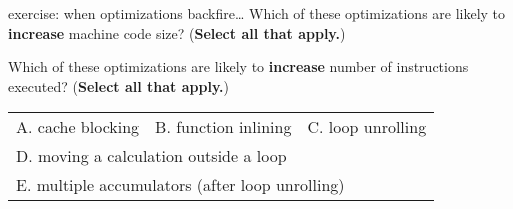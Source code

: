 \begin{frame}{exercise: when optimizations backfire\ldots}
Which of these optimizations are likely to \textbf{increase} 
machine code size? (\textbf{Select all that apply.})
\vspace{1cm}

Which of these optimizations are likely to \textbf{increase}
number of instructions executed? (\textbf{Select all that apply.})
\vspace{1cm}

\begin{tabular}{lll}
A. cache blocking & B. function inlining & C. loop unrolling \\
\multicolumn{3}{l}{D. moving a calculation outside a loop} \\
\multicolumn{3}{l}{E. multiple accumulators (after loop unrolling)} \\
\end{tabular}
\end{frame}
